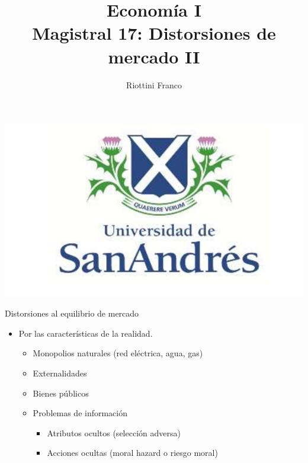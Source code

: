 \documentclass{beamer}
\title[Economía I]{Economía I \vspace{4mm}
\\ Magistral 17: Distorsiones de mercado II}
\date{}
\author[Riottini]{Riottini Franco}
\institute[]{Universidad de San Andrés}
\begin{document}
\begin{frame}
\titlepage
\centering
\includegraphics[scale=0.2]{../Figures/logoUDESA.jpg} 
\end{frame}


\begin{frame}{Distorsiones al equilibrio de mercado}
    \begin{itemize}
        \item Por las características de la realidad.
        \begin{itemize}
            \item Monopolios naturales (red eléctrica, agua, gas)   
             \vspace{1mm}
            \item Externalidades
             \vspace{1mm}
            \item Bienes públicos
            \vspace{1mm}
            \item Problemas de información
            \begin{itemize}
                \item Atributos ocultos (selección adversa)
                 \vspace{1mm}
                \item Acciones ocultas (moral hazard o riesgo moral)
            \end{itemize}        
        \end{itemize}
    \end{itemize}
\end{frame}
\end{document}
